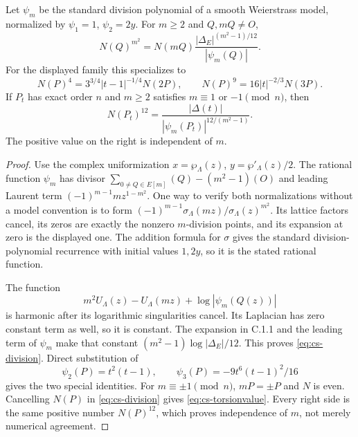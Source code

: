 \begin{statement}
Let $\psi_m$ be the standard division polynomial of a smooth
Weierstrass model, normalized by $\psi_1=1$, $\psi_2=2y$.
For $m\ge2$ and $Q,mQ\ne O$,
\begin{equation}\label{eq:cs-division}
 N(Q)^{m^2}
       =N(mQ)\frac{|\Delta_E|^{(m^2-1)/12}}{|\psi_m(Q)|}.
\end{equation}
For the displayed family this specializes to
\[
 N(P)^4=3^{3/4}|t-1|^{-1/4}N(2P),\qquad
 N(P)^9=16|t|^{-2/3}N(3P).
\]
If $P_t$ has exact order $n$ and $m\ge2$ satisfies
$m\equiv1$ or $-1\pmod n$, then
\begin{equation}\label{eq:cs-torsionvalue}
 N(P_t)^{12}
       =\frac{|\Delta(t)|}{|\psi_m(P_t)|^{12/(m^2-1)}}.
\end{equation}
The positive value on the right is independent of $m$.
\end{statement}
\begin{proof}
Use the complex uniformization $x=\wp_\Lambda(z)$,
$y=\wp'_\Lambda(z)/2$. The rational function $\psi_m$ has divisor
$\sum_{0\ne Q\in E[m]}(Q)-(m^2-1)(O)$ and leading Laurent term
$(-1)^{m-1}m z^{1-m^2}$. One way to verify both normalizations without
a model convention is to form
$(-1)^{m-1}\sigma_\Lambda(mz)/\sigma_\Lambda(z)^{m^2}$.
Its lattice factors cancel, its zeros are exactly the nonzero
$m$-division points, and its expansion at zero is the displayed
one. The addition formula for $\sigma$ gives the standard
division-polynomial recurrence with initial values $1,2y$, so it is
the stated rational function.

The function
\[
 m^2U_\Lambda(z)-U_\Lambda(mz)
                    +\log|\psi_m(Q(z))|
\]
is harmonic after its logarithmic singularities cancel. Its
Laplacian has zero constant term as well, so it is constant.
The expansion in C.1.1 and the leading term of $\psi_m$ make that
constant $(m^2-1)\log|\Delta_E|/12$. This proves
\eqref{eq:cs-division}. Direct substitution of
\[
 \psi_2(P)=t^2(t-1),\qquad
 \psi_3(P)=-9t^6(t-1)^2/16
\]
gives the two special identities. For $m\equiv\pm1\pmod n$,
$mP=\pm P$ and $N$ is even. Cancelling $N(P)$ in
\eqref{eq:cs-division} gives \eqref{eq:cs-torsionvalue}.
Every right side is the same positive number $N(P)^{12}$, which
proves independence of $m$, not merely numerical agreement.
\end{proof}

